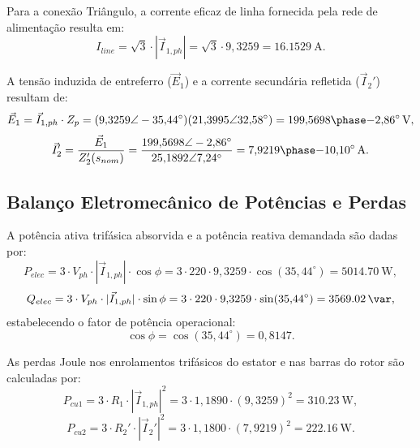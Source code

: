 Para a conexão Triângulo, a corrente eficaz de linha fornecida pela rede de alimentação resulta em:
\begin{equation}
I_{line} = \sqrt{3} \cdot |\vec{I}_{1,ph}| = \sqrt{3} \cdot 9{,}3259 = \SI{16,1529}{\ampere}.
\label{eq:corrente_linha_nominal}
\end{equation}

A tensão induzida de entreferro ($\vec{E}_1$) e a corrente secundária refletida ($\vec{I}_2'$) resultam de:
\begin{equation}
\vec{E}_1 = \vec{I}_{1,ph} \cdot Z_p = (9{,}3259 \angle -35{,}44^\circ)(21{,}3995 \angle 32{,}58^\circ) = \phasor{199{,}5698}{-2{,}86}\,\text{V},
\label{eq:tensao_entreferro_nominal}
\end{equation}
\begin{equation}
\vec{I}_2' = \frac{\vec{E}_1}{Z_2'(s_{nom})} = \frac{199{,}5698 \angle -2{,}86^\circ}{25{,}1892 \angle 7{,}24^\circ} = \phasor{7{,}9219}{-10{,}10}\,\text{A}.
\label{eq:corrente_rotor_nominal}
\end{equation}

\subsection{Balanço Eletromecânico de Potências e Perdas}\label{subsec:balanco_nominal}

A potência ativa trifásica absorvida e a potência reativa demandada são dadas por:
\begin{equation}
P_{elec} = 3 \cdot V_{ph} \cdot |\vec{I}_{1,ph}| \cdot \cos\phi = 3 \cdot 220 \cdot 9{,}3259 \cdot \cos(35{,}44^\circ) = \SI{5014,70}{\watt},
\label{eq:potencia_ativa_nominal}
\end{equation}
\begin{equation}
Q_{elec} = 3 \cdot V_{ph} \cdot |\vec{I}_{1,ph}| \cdot \sin\phi = 3 \cdot 220 \cdot 9{,}3259 \cdot \sin(35{,}44^\circ) = \SI{3569,02}{\var},
\label{eq:potencia_reativa_nominal}
\end{equation}
estabelecendo o fator de potência operacional:
\begin{equation}
\cos\phi = \cos(35{,}44^\circ) = 0{,}8147.
\label{eq:fator_potencia_nominal}
\end{equation}

As perdas Joule nos enrolamentos trifásicos do estator e nas barras do rotor são calculadas por:
\begin{equation}
P_{cu1} = 3 \cdot R_1 \cdot |\vec{I}_{1,ph}|^2 = 3 \cdot 1{,}1890 \cdot (9{,}3259)^2 = \SI{310,23}{\watt},
\label{eq:perdas_cu1}
\end{equation}
\begin{equation}
P_{cu2} = 3 \cdot R_2' \cdot |\vec{I}_2'|^2 = 3 \cdot 1{,}1800 \cdot (7{,}9219)^2 = \SI{222,16}{\watt}.
\label{eq:perdas_cu2}
\end{equation}

